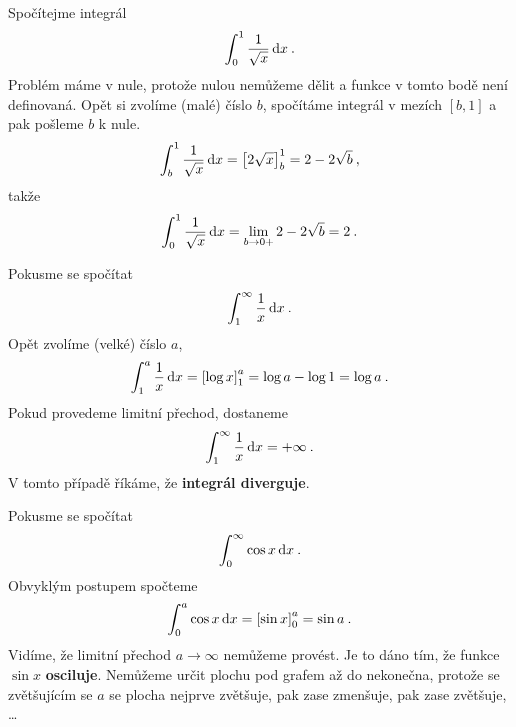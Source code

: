 \begin{example}
    Spočítejme integrál \begin{align}
        \int_0^1 \frac{1}{\sqrt{x}} \, \mathrm{d} x \:.
    \end{align}
    Problém máme v nule, protože nulou nemůžeme dělit a funkce v tomto bodě není definovaná. Opět si zvolíme (malé) číslo $b$, spočítáme integrál v mezích $[b,1]$ a pak pošleme $b$ k nule.
    \begin{align}
        \int_b^1 \frac{1}{\sqrt{x}} \, \mathrm{d} x = \left[ 2 \sqrt{x} \right]_b^1 = 2 - 2 \sqrt{b} \:,
    \end{align}
    takže \begin{align}
        \int_0^1 \frac{1}{\sqrt{x}} \, \mathrm{d} x = \lim_{b \rightarrow 0+} 2 - 2 \sqrt{b} = 2 \:.
    \end{align}
\end{example}

\begin{example}
    Pokusme se spočítat \begin{align}
        \int_1^\infty \frac{1}{x} \, \mathrm{d} x \:.
    \end{align}
    Opět zvolíme (velké) číslo $a$, \begin{align}
        \int_1^a \frac{1}{x} \, \mathrm{d} x = \left[ \log x \right]_1^a = \log a - \log 1 = \log a \:.  
    \end{align}
    Pokud provedeme limitní přechod, dostaneme \begin{align}
        \int_1^\infty \frac{1}{x} \, \mathrm{d} x = + \infty \:.
    \end{align}
    V tomto případě říkáme, že \textbf{integrál diverguje}.
\end{example}

\begin{example}
    Pokusme se spočítat \begin{align}
        \int_0^\infty \cos x \, \mathrm{d} x \:.
    \end{align}
    Obvyklým postupem spočteme \begin{align}
        \int_0^a \cos x \, \mathrm{d} x = \left[ \sin x \right]_0^a = \sin a \:.
    \end{align}
    Vidíme, že limitní přechod $a \rightarrow \infty$ nemůžeme provést. Je to dáno tím, že funkce $\sin x$ \textbf{osciluje}. Nemůžeme určit plochu pod grafem až do nekonečna, protože se zvětšujícím se $a$ se plocha nejprve zvětšuje, pak zase zmenšuje, pak zase zvětšuje, \dots
\end{example}

